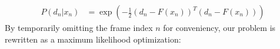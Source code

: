 %

\iffalse
%
% 
%
% 
\begin{align}
P(d_n|x_n) &= \exp \left( - \tfrac{1}{2}(d_n - F(x_n))^T (d_n - F(x_n)) \right)
\label{eq:posterior}
\end{align}
% 
By temporarily omitting the frame index $n$ for conveniency, our problem is rewritten as a maximum likelihood optimization:
